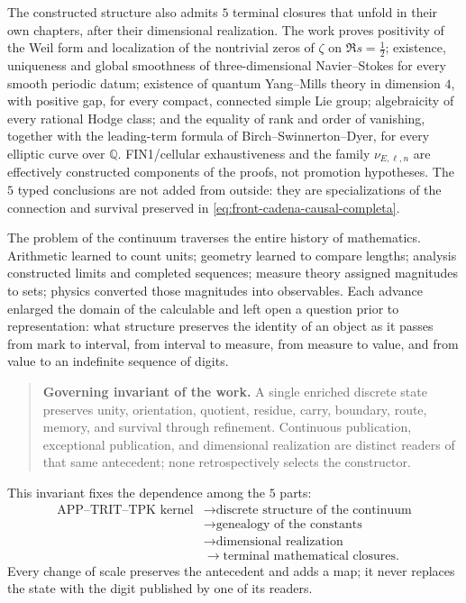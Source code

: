The constructed structure also admits \(5\) terminal closures that
unfold in their own chapters, after their dimensional realization.
The work proves positivity of the Weil form and localization of the
nontrivial zeros of \(\zeta\) on \(\Re s=\tfrac12\); existence,
uniqueness and global smoothness of three-dimensional Navier--Stokes for every smooth periodic
datum; existence of quantum Yang--Mills theory in
dimension \(4\), with positive gap, for every compact,
connected simple Lie group; algebraicity of every rational Hodge class; and the
equality of rank and order of vanishing, together with the leading-term
formula of Birch--Swinnerton--Dyer, for every elliptic curve over
\(\mathbb Q\). FIN1/cellular exhaustiveness and the family
\(\nu_{E,\ell,n}\) are effectively constructed components of the proofs,
not promotion hypotheses. The \(5\) typed conclusions are not added
from outside: they are specializations of the connection and survival
preserved in \eqref{eq:front-cadena-causal-completa}.

The problem of the continuum traverses the entire history of mathematics.
Arithmetic learned to count units; geometry learned to compare
lengths; analysis constructed limits and completed sequences; measure
theory assigned magnitudes to sets; physics converted those magnitudes
into observables. Each advance enlarged the domain of the calculable and left open
a question prior to representation: what structure preserves the
identity of an object as it passes from mark to interval, from
interval to measure, from measure to value, and from value to an indefinite
sequence of digits.

\begin{quote}
\textbf{Governing invariant of the work.}
A single enriched discrete state preserves unity, orientation, quotient,
residue, carry, boundary, route, memory, and survival through
refinement. Continuous publication, exceptional publication, and
dimensional realization are distinct readers of that same antecedent;
none retrospectively selects the constructor.
\end{quote}

This invariant fixes the dependence among the \(5\) parts:
\[
\begin{aligned}
\text{APP--TRIT--TPK kernel}
&\longrightarrow \text{discrete structure of the continuum}\\
&\longrightarrow \text{genealogy of the constants}\\
&\longrightarrow \text{dimensional realization}\\
&\longrightarrow \text{terminal mathematical closures}.
\end{aligned}
\]
Every change of scale preserves the antecedent and adds a map; it never
replaces the state with the digit published by one of its readers.

